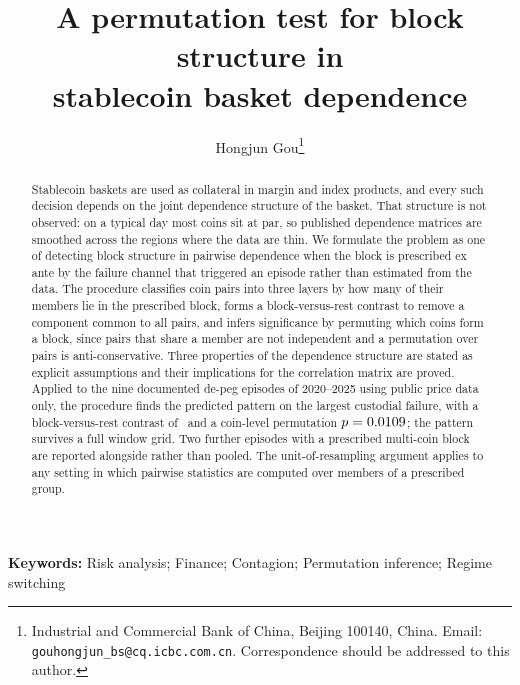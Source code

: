 \documentclass[11pt]{article}
\title{\Large\bfseries A permutation test for block structure in\\[2pt] stablecoin basket dependence}
\author{Hongjun Gou\thanks{Industrial and Commercial Bank of China, Beijing 100140, China. Email: \texttt{gouhongjun\_bs@cq.icbc.com.cn}. Correspondence should be addressed to this author.}}
\date{}
\theoremstyle{definition}
\begin{document}
\maketitle

\begin{abstract}
\noindent Stablecoin baskets are used as collateral in margin and index products, and every such decision depends on the joint dependence structure of the basket. That structure is not observed: on a typical day most coins sit at par, so published dependence matrices are smoothed across the regions where the data are thin. We formulate the problem as one of detecting block structure in pairwise dependence when the block is prescribed ex ante by the failure channel that triggered an episode rather than estimated from the data. The procedure classifies coin pairs into three layers by how many of their members lie in the prescribed block, forms a block-versus-rest contrast to remove a component common to all pairs, and infers significance by permuting which coins form a block, since pairs that share a member are not independent and a permutation over pairs is anti-conservative. Three properties of the dependence structure are stated as explicit assumptions and their implications for the correlation matrix are proved. Applied to the nine documented de-peg episodes of 2020--2025 using public price data only, the procedure finds the predicted pattern on the largest custodial failure, with a block-versus-rest contrast of \GUSDCSVBDID\ and a coin-level permutation $p=0.0109$; the pattern survives a full window grid. Two further episodes with a prescribed multi-coin block are reported alongside rather than pooled. The unit-of-resampling argument applies to any setting in which pairwise statistics are computed over members of a prescribed group.
\end{abstract}

\medskip
\noindent\textbf{Keywords:} Risk analysis; Finance; Contagion; Permutation inference; Regime switching







\end{document}
